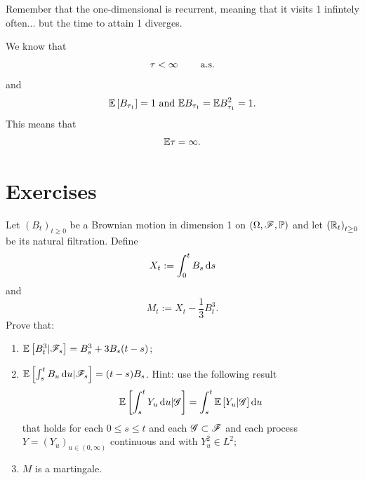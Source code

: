 \documentclass[12pt]{report}
\begin{document}
Remember that the one-dimensional \bwm{} is recurrent, meaning that it visits 1 infintely often... but the time to attain 1 diverges. \begin{fancyproof}
	We know that 
\begin{equation*}
	\tau<\infty\qquad\text{ a.s.}{}
\end{equation*}
and
\begin{equation*}
	\mathbb{E}\left[B_{\tau_{1}}\right]=1\text{ and }\mathbb{E} B_{\tau_{1}}=\mathbb{E} B^{2}_{\tau_{1}}=1.
\end{equation*}
This means that
\begin{equation*}
	\mathbb{E}{\tau}=\infty.
\end{equation*}
\end{fancyproof}
\section*{Exercises}
\label{sec:exer2}
\begin{exercise}
	Let ${(B_{t})}_{t\geq 0}$ be a Brownian motion in dimension 1 on $(\Omega,\mathscr{F},\mathbb{P})$ and let ${(\mathbb{R}_{t})}_{t\geq 0}$ be its natural filtration. Define
	\begin{equation*}
		X_{t}:=\int_{0}^{t}B_{s}\mathop{}\!\mathrm{d} s
	\end{equation*}
	and
	\begin{equation*}
		M_{t}:=X_{t}-\frac{1}{3}B_{t}^{3}.
	\end{equation*}
	Prove that:
	\begin{enumerate}
		\item $\mathbb{E}\left[B^{3}_{t}|\mathscr{F}_{s}\right]=B^{3}_{s}+3B_{s}(t-s)$;
		\item $\mathbb{E}\left[\int_{s}^{t}B_{u}\mathop{}\!\mathrm{d} u|\mathscr{F}_{s}\right]=(t-s)B_{s}$. Hint: use the following result
		\begin{equation*}
			\mathbb{E}\left[\int_{s}^{t} Y_{u}\mathop{}\!\mathrm{d} u|\mathscr{G}\right]=\int_{s}^{t}\mathbb{E}\left[Y_{u}|\mathscr{G}\right]\mathop{}\!\mathrm{d} u
		\end{equation*}
		that holds for each $0\leq s\leq t$ and each \sa{} $\mathscr{G}\subset\mathscr{F}$ and each process $Y={(Y_{u})}_{u\in(0,\infty)}$ continuous and with $Y_{u}^{2}\in L^{2}$;
		\item $M$ is a martingale.
	\end{enumerate}
\end{exercise}
\end{document}
